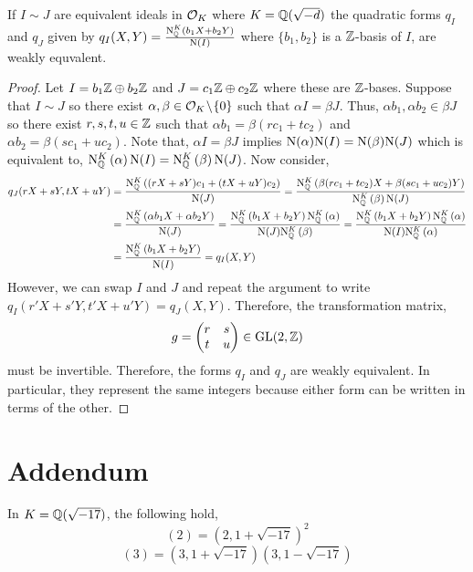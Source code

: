 \documentclass[12pt]{extarticle}
\begin{document}
\begin{lemma} \label{complimentlem}
If $I \sim J$ are equivalent ideals in $\mathcal{O}_{K}$ where $K = \mathbb{Q}(\sqrt{-d})$ the quadratic forms $q_I$ and $q_J$ given by $q_I(X, Y) = \frac{\mathrm{N}^{K}_{\mathbb{Q}}\left(b_1 X + b_2 Y\right)}{\mathrm{N}(I)}$ where $\{b_1, b_2\}$ is a $\mathbb{Z}$-basis of $I$, are weakly equvalent. 
\end{lemma}
\begin{proof}
Let $I = b_1 \mathbb{Z} \oplus b_2 \mathbb{Z}$ and $J = c_1 \mathbb{Z} \oplus c_2 \mathbb{Z}$ where these are $\mathbb{Z}$-bases. Suppose that $I \sim J$ so there exist $\alpha, \beta \in \mathcal{O}_{K} \! \setminus \! \{0\}$ such that $\alpha I = \beta J$. Thus, $\alpha b_1, \alpha b_2 \in \beta J$ so there exist $r, s, t, u \in \mathbb{Z}$ such that $\alpha b_1 = \beta (r c_1 + t c_2)$ and $\alpha b_2 = \beta (s c_1 + u c_2)$. Note that, $\alpha I = \beta J$ implies $\mathrm{N}(\alpha) \mathrm{N}(I) = \mathrm{N}(\beta) \mathrm{N}(J)$ which is equivalent to, $\mathrm{N}^{K}_{\mathbb{Q}}\left(\alpha\right) \mathrm{N}(I) = \mathrm{N}^{K}_{\mathbb{Q}}\left(\beta\right) \mathrm{N}(J)$. Now consider, 
\begin{align*}
q_J(rX + sY, tX + uY) & = \frac{\mathrm{N}^{K}_{\mathbb{Q}}\left((r X + sY) c_1 + (tX + uY) c_2\right)}{\mathrm{N}(J)} = \frac{\mathrm{N}^{K}_{\mathbb{Q}}\left(\beta (r c_1 + t c_2) X + \beta (s c_1 + u c_2) Y\right)}{\mathrm{N}^{K}_{\mathbb{Q}}\left(\beta\right)\mathrm{N}(J)} \\ & = \frac{\mathrm{N}^{K}_{\mathbb{Q}}\left(\alpha b_1 X + \alpha b_2 Y\right)}{\mathrm{N}(J)} = \frac{\mathrm{N}^{K}_{\mathbb{Q}}\left( b_1 X +  b_2 Y\right) \mathrm{N}^{K}_{\mathbb{Q}}\left(\alpha\right)}{\mathrm{N}(J) \mathrm{N}^{K}_{\mathbb{Q}}\left(\beta\right)} = \frac{\mathrm{N}^{K}_{\mathbb{Q}}\left( b_1 X +  b_2 Y\right) \mathrm{N}^{K}_{\mathbb{Q}}\left(\alpha\right)}{\mathrm{N}(I) \mathrm{N}^{K}_{\mathbb{Q}}\left(\alpha\right)} \\
& = \frac{\mathrm{N}^{K}_{\mathbb{Q}}\left( b_1 X +  b_2 Y\right)}{\mathrm{N}(I)} = q_I(X, Y)
\end{align*}
However, we can swap $I$ and $J$ and repeat the argument to write $q_I(r' X + s' Y, t' X + u' Y) = q_J(X, Y)$. Therefore, the transformation matrix,
\[g = \begin{pmatrix}
r & s \\
t & u
\end{pmatrix} \in \mathrm{GL}(2, \mathbb{Z}) \]
must be invertible. Therefore, the forms $q_I$ and $q_J$ are weakly equivalent. In particular, they represent the same integers because either form can be written in terms of the other. 
\end{proof}

\section*{Addendum}
\begin{lemma}
In $K = \mathbb{Q}(\sqrt{-17})$, the following hold, \[(2) = (2, 1 + \sqrt{-17})^2\]
\[(3) = (3, 1 + \sqrt{-17})(3, 1 - \sqrt{-17})\] 
\end{lemma}
\end{document}
